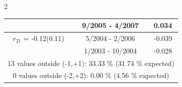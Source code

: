 \begin{multicols}{2}
{\begin{tabular}{ccc}
&        9/2005 -  4/2007 &        0.034  \vspace{-.02in} \\ \hline 
  $r_{21}$ = -0.12(0.11) &       5/2004 -  2/2006 &       -0.039    \vspace{-.10in} \\ 
  &        1/2003 - 10/2004 &       -0.028  \vspace{-.02in}   \\ \hline 
  \multicolumn{3}{c}{              13 values outside (-1,+1): 33.33  \% (31.74  \% expected)}\vspace{-.10in} \\ 
\multicolumn{3}{c}{               0 values outside (-2,+2):  0.00 \%  (4.56 \% expected) } \\
 \end{tabular} \\ 
 } 
\end{multicols} 
